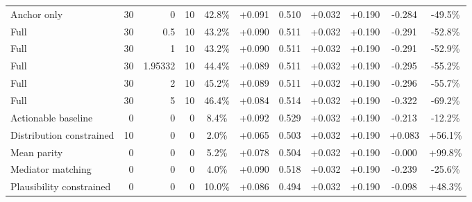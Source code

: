 \begin{table}[htbp]
\begin{tabular}{lrrrccccccc}
Anchor only & 30 & 0 & 10 & 42.8\% & +0.091 & 0.510 & +0.032 & +0.190 & -0.284 & -49.5\% \\
Full & 30 & 0.5 & 10 & 43.2\% & +0.090 & 0.511 & +0.032 & +0.190 & -0.291 & -52.8\% \\
Full & 30 & 1 & 10 & 43.2\% & +0.090 & 0.511 & +0.032 & +0.190 & -0.291 & -52.9\% \\
Full & 30 & 1.95332 & 10 & 44.4\% & +0.089 & 0.511 & +0.032 & +0.190 & -0.295 & -55.2\% \\
Full & 30 & 2 & 10 & 45.2\% & +0.089 & 0.511 & +0.032 & +0.190 & -0.296 & -55.7\% \\
Full & 30 & 5 & 10 & 46.4\% & +0.084 & 0.514 & +0.032 & +0.190 & -0.322 & -69.2\% \\
Actionable baseline & 0 & 0 & 0 & 8.4\% & +0.092 & 0.529 & +0.032 & +0.190 & -0.213 & -12.2\% \\
Distribution constrained & 10 & 0 & 0 & 2.0\% & +0.065 & 0.503 & +0.032 & +0.190 & +0.083 & +56.1\% \\
Mean parity & 0 & 0 & 0 & 5.2\% & +0.078 & 0.504 & +0.032 & +0.190 & -0.000 & +99.8\% \\
Mediator matching & 0 & 0 & 0 & 4.0\% & +0.090 & 0.518 & +0.032 & +0.190 & -0.239 & -25.6\% \\
Plausibility constrained & 0 & 0 & 0 & 10.0\% & +0.086 & 0.494 & +0.032 & +0.190 & -0.098 & +48.3\% \\
\bottomrule
\end{tabular}
\end{table}